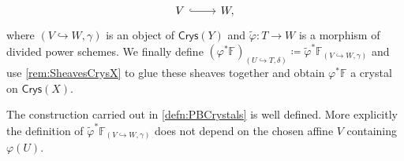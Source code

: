 \begin{defn}
\begin{equation*}
\begin{tikzcd}
		V \arrow[r, "", hookrightarrow] &
		W
	,\end{tikzcd}
	\end{equation*}
	where $\left(V \hookrightarrow W, \gamma\right)$ is an object of $\mathsf{Crys}(Y)$
	and $\widetilde{\varphi}\colon T \to W$ is a morphism of divided power schemes.
	We finally define $\left( \varphi^* \mathbb{F} \right)_{\left(U \hookrightarrow T, \delta\right)}
	\coloneqq \widetilde{\varphi}^* \mathbb{F}_{\left(V \hookrightarrow W, \gamma\right)}$
	and use \cref{rem:SheavesCrysX} to glue these sheaves
	together and obtain $\varphi^* \mathbb{F}$ a crystal
	on $\mathsf{Crys}(X)$.
\end{defn}


\begin{prop}[]
	The construction carried out in \cref{defn:PBCrystals} is well defined.
	More explicitly the definition of $\widetilde{\varphi}^* 
	\mathbb{F}_{\left(V \hookrightarrow W, \gamma\right)}$ does not depend
	on the chosen affine $V$ containing $\varphi(U)$.
\end{prop}
